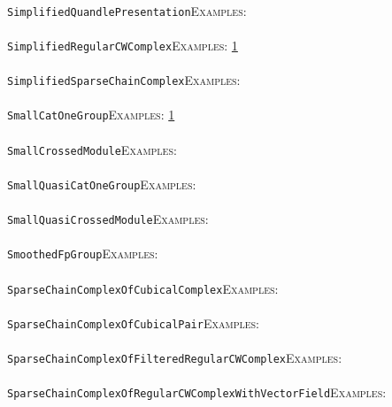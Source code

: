 \documentclass[a4paper,11pt]{report}
\begin{document}
{{ \\
 \texttt{SimplifiedQuandlePresentation}{\nobreakspace}{\nobreakspace}{\nobreakspace}{\nobreakspace}\textsc{Examples:} \\
 \\
 \texttt{SimplifiedRegularCWComplex}{\nobreakspace}{\nobreakspace}{\nobreakspace}{\nobreakspace}\textsc{Examples:} \href{../www/SideLinks/About/aboutPeripheral.html} {1}{\nobreakspace} \\
 \\
 \texttt{SimplifiedSparseChainComplex}{\nobreakspace}{\nobreakspace}{\nobreakspace}{\nobreakspace}\textsc{Examples:} \\
 \\
 \texttt{SmallCatOneGroup}{\nobreakspace}{\nobreakspace}{\nobreakspace}{\nobreakspace}\textsc{Examples:} \href{../www/SideLinks/About/aboutquasi.html} {1}{\nobreakspace} \\
 \\
 \texttt{SmallCrossedModule}{\nobreakspace}{\nobreakspace}{\nobreakspace}{\nobreakspace}\textsc{Examples:} \\
 \\
 \texttt{SmallQuasiCatOneGroup}{\nobreakspace}{\nobreakspace}{\nobreakspace}{\nobreakspace}\textsc{Examples:} \\
 \\
 \texttt{SmallQuasiCrossedModule}{\nobreakspace}{\nobreakspace}{\nobreakspace}{\nobreakspace}\textsc{Examples:} \\
 \\
 \texttt{SmoothedFpGroup}{\nobreakspace}{\nobreakspace}{\nobreakspace}{\nobreakspace}\textsc{Examples:} \\
 \\
 \texttt{SparseChainComplexOfCubicalComplex}{\nobreakspace}{\nobreakspace}{\nobreakspace}{\nobreakspace}\textsc{Examples:} \\
 \\
 \texttt{SparseChainComplexOfCubicalPair}{\nobreakspace}{\nobreakspace}{\nobreakspace}{\nobreakspace}\textsc{Examples:} \\
 \\
 \texttt{SparseChainComplexOfFilteredRegularCWComplex}{\nobreakspace}{\nobreakspace}{\nobreakspace}{\nobreakspace}\textsc{Examples:} \\
 \\
 \texttt{SparseChainComplexOfRegularCWComplexWithVectorField}{\nobreakspace}{\nobreakspace}{\nobreakspace}{\nobreakspace}\textsc{Examples:} \\
 \\
}}
\end{document}
